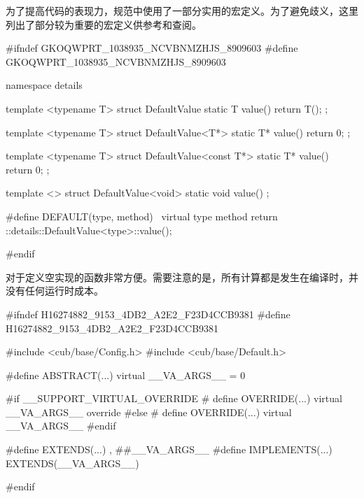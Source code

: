 \begin{content}

为了提高代码的表现力，规范中使用了一部分实用的宏定义。为了避免歧义，这里列出了部分较为重要的宏定义供参考和查阅。

\begin{leftbar}
\begin{c++}[caption={\ttfamily{cub/base/Default.h}}]
#ifndef GKOQWPRT_1038935_NCVBNMZHJS_8909603
#define GKOQWPRT_1038935_NCVBNMZHJS_8909603

namespace details
{
   template <typename T>
   struct DefaultValue
   {
      static T value()
      {
         return T();
      }
   };

   template <typename T>
   struct DefaultValue<T*>
   {
       static T* value()
       {
           return 0;
       }
   };

   template <typename T>
   struct DefaultValue<const T*>
   {
       static T* value()
       {
           return 0;
       }
   };

   template <>
   struct DefaultValue<void>
   {
      static void value()
      {
      }
   };
}

#define DEFAULT(type, method)  \
    virtual type method { return ::details::DefaultValue<type>::value(); }

#endif
\end{c++}
\end{leftbar}

对于定义空实现的函数非常方便。需要注意的是，所有计算都是发生在编译时，并没有任何运行时成本。

\begin{leftbar}
\begin{c++}[caption={\ttfamily{cub/base/Keywords.h}}]
#ifndef H16274882_9153_4DB2_A2E2_F23D4CCB9381
#define H16274882_9153_4DB2_A2E2_F23D4CCB9381

#include <cub/base/Config.h>
#include <cub/base/Default.h>

#define ABSTRACT(...) virtual __VA_ARGS__ = 0

#if __SUPPORT_VIRTUAL_OVERRIDE
#   define OVERRIDE(...) virtual __VA_ARGS__ override
#else
#   define OVERRIDE(...) virtual __VA_ARGS__
#endif

#define EXTENDS(...) , ##__VA_ARGS__
#define IMPLEMENTS(...) EXTENDS(__VA_ARGS__)

#endif
\end{c++}
\end{leftbar}


\end{content}
